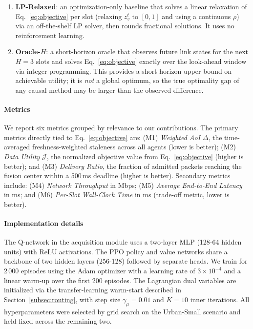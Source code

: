 \documentclass[final,3p,times,review,sort&compress]{elsarticle}
\begin{document}
\begin{enumerate}
\item \textbf{LP-Relaxed}: an optimization-only baseline that solves a linear relaxation of Eq.~\eqref{eq:objective} per slot (relaxing $z_v^t$ to $[0,1]$ and using a continuous $\rho$) via an off-the-shelf LP solver, then rounds fractional solutions. It uses no reinforcement learning.
\item \textbf{Oracle-$H$}: a short-horizon oracle that observes future link states for the next $H{=}3$ slots and solves Eq.~\eqref{eq:objective} exactly over the look-ahead window via integer programming. This provides a short-horizon upper bound on achievable utility; it is \emph{not} a global optimum, so the true optimality gap of any causal method may be larger than the observed difference.
\end{enumerate}

\paragraph{Metrics}
We report six metrics grouped by relevance to our contributions. The primary metrics directly tied to Eq.~\eqref{eq:objective} are: (M1) \emph{Weighted AoI} $\bar{\Delta}$, the time-averaged freshness-weighted staleness across all agents (lower is better); (M2) \emph{Data Utility} $\mathcal{J}$, the normalized objective value from Eq.~\eqref{eq:objective} (higher is better); and (M3) \emph{Delivery Ratio}, the fraction of admitted packets reaching the fusion center within a 500\,ms deadline (higher is better). Secondary metrics include: (M4) \emph{Network Throughput} in Mbps; (M5) \emph{Average End-to-End Latency} in ms; and (M6) \emph{Per-Slot Wall-Clock Time} in ms (trade-off metric, lower is better).

\paragraph{Implementation details}
The Q-network in the acquisition module uses a two-layer MLP (128-64 hidden units) with ReLU activations. The PPO policy and value networks share a backbone of two hidden layers (256-128) followed by separate heads. We train for 2\,000 episodes using the Adam optimizer with a learning rate of $3\times10^{-4}$ and a linear warm-up over the first 200 episodes. The Lagrangian dual variables are initialized via the transfer-learning warm-start described in Section~\ref{subsec:routing}, with step size $\gamma_\mu{=}0.01$ and $K{=}10$ inner iterations. All hyperparameters were selected by grid search on the Urban-Small scenario and held fixed across the remaining two.
\end{document}
